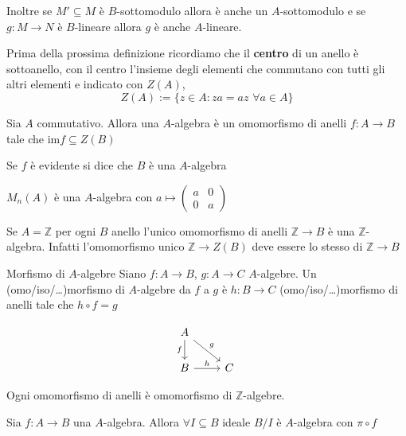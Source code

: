Inoltre se \(M' \subseteq M \) è \(B\)-sottomodulo allora è anche un
\(A\)-sottomodulo e se \(g : M \to N\) è \(B\)-lineare allora \(g\) è anche \(A\)-lineare.


Prima della prossima definizione ricordiamo che il \textbf{centro} di un anello
è sottoanello, con il centro l'insieme degli elementi che commutano con tutti
gli altri elementi e indicato con \(Z{(A)}\),
\[
  Z{(A)} := \{z \in A : za = az \,\,\forall a \in A\} 
\]
\begin{definition}{}
    Sia \(A\) commutativo. Allora una \(A\)-algebra è un omomorfismo di anelli
    \(f:A\to B\) tale che \(\mathrm{im}f \subseteq Z{(B)}\) 
\end{definition}
Se \(f\) è evidente si dice che \(B\) è una \(A\)-algebra
\begin{example}{}
    \(M_n{(A)}\) è una \(A\)-algebra con \(a \mapsto \begin{pmatrix}
        
        a & 0 \\
        0 & a
    \end{pmatrix}\) 
\end{example}

\begin{example}{}
    Se \(A = \mathbb{Z}\) per ogni \(B\) anello l'unico omomorfismo di anelli \(\mathbb{Z}\to B\) è una \(\mathbb{Z}\)-algebra. Infatti l'omomorfismo unico \(\mathbb{Z} \to Z{(B)}\) deve essere lo stesso di \(\mathbb{Z} \to B\) 
\end{example}

\begin{definition}{Morfismo di \(A\)-algebre}
    Siano \(f : A\to B\), \(g : A\to C\) \(A\)-algebre. Un (omo/iso/\dots)morfismo di
    \(A\)-algebre da \(f\) a \(g\) è \(h : B\to C\) (omo/iso/\dots)morfismo di anelli tale
    che \(h \circ f = g\) 
\end{definition}
\[\begin{tikzcd}
	A \\
    B & C
    \arrow["{f}"', from=1-1, to=2-1]
	\arrow["{g}", from=1-1, to=2-2]
    \arrow["{h}", from=2-1, to=2-2]
\end{tikzcd}\]

\begin{example}{}
    Ogni omomorfismo di anelli è omomorfismo di \(\mathbb{Z}\)-algebre. 
\end{example}
\begin{example}{}
    Sia \(f : A\to B\) una \(A\)-algebra. Allora \(\forall I \subseteq B \) ideale \(B / I\) è \(A\)-algebra con \(\pi \circ f\) 
\end{example}

